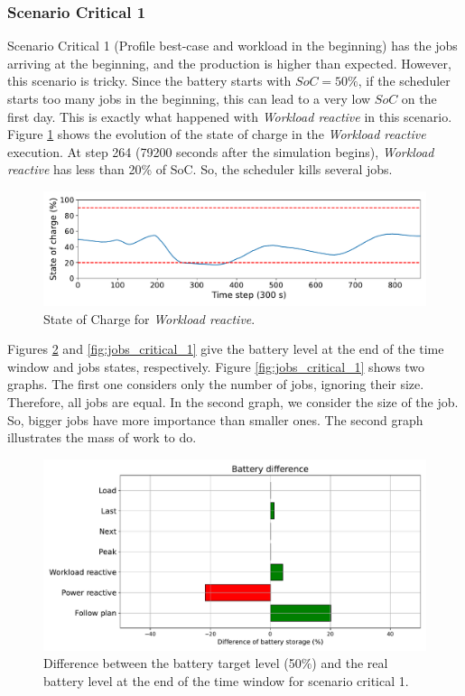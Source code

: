 \subsubsection{Scenario Critical 1}
Scenario Critical 1 (Profile best-case and workload in the beginning) has the jobs arriving at the beginning, and the production is higher than expected. However, this scenario is tricky. Since the battery starts with $SoC = 50\%$, if the scheduler starts too many jobs in the beginning, this can lead to a very low $SoC$ on the first day. This is exactly what happened with \emph{Workload reactive} in this scenario. Figure \ref{fig:DPM_soc} shows the evolution of the state of charge in the \emph{Workload reactive} execution. At step 264 (79200 seconds after the simulation begins), \emph{Workload reactive} has less than 20\% of SoC. So, the scheduler kills several jobs. 

\begin{figure}[!htb]
    \centering
    \includegraphics[scale=0.55]{Images/Compensations/critical_soc_s1.pdf}
    \caption{State of Charge for \emph{Workload reactive}.}
    \label{fig:DPM_soc}
\end{figure}

Figures \ref{fig:SoC_critical_1} and \ref{fig:jobs_critical_1} give the battery level at the end of the time window and jobs states, respectively. Figure \ref{fig:jobs_critical_1} shows two graphs. The first one considers only the number of jobs, ignoring their size. Therefore, all jobs are equal. In the second graph, we consider the size of the job. So, bigger jobs have more importance than smaller ones. The second graph illustrates the mass of work to do.

\begin{figure}[!htb]
    \centering
    \includegraphics[scale=0.55]{Images/Compensations/battery_critical_1.pdf}
    \caption{Difference between the battery target level (50\%) and the real battery level at the end of the time window for scenario critical 1.}
    \label{fig:SoC_critical_1}
\end{figure}

